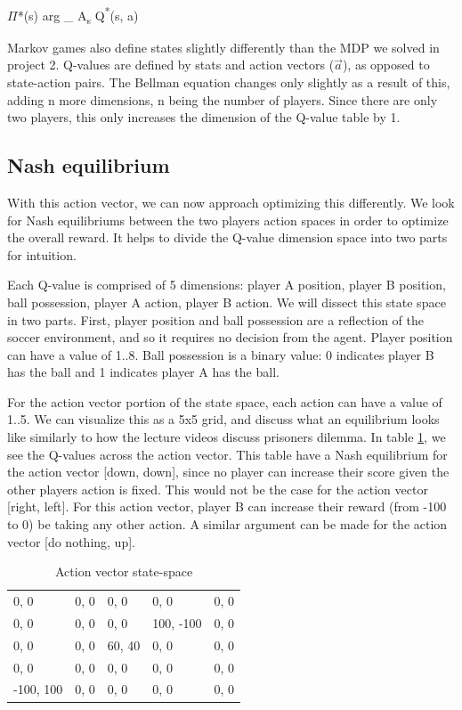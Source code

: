 \documentclass[conference]{IEEEtran}
\begin{document}
\begin{algorithm}
    \label{alg:optimal-policy}
    $\Pi$*(s) \in arg \max_{ \in A\textsubscript{s}} Q\textsuperscript{*}(s, a)
\end{algorithm}

Markov games also define states slightly differently than the MDP we solved in project 2. Q-values are defined by stats and action vectors ($\overrightarrow{a}$), as opposed to state-action pairs. The Bellman equation changes only slightly as a result of this, adding n more dimensions, n being the number of players. Since there are only two players, this only increases the dimension of the Q-value table by 1.

\subsection{Nash equilibrium}
With this action vector, we can now approach optimizing this differently. We look for Nash equilibriums between the two players action spaces in order to optimize the overall reward. It helps to divide the Q-value dimension space into two parts for intuition.

Each Q-value is comprised of 5 dimensions: player A position, player B position, ball possession, player A action, player B action. We will dissect this state space in two parts. First, player position and ball possession are a reflection of the soccer environment, and so it requires no decision from the agent. Player position can have a value of {1..8}. Ball possession is a binary value: 0 indicates player B has the ball and 1 indicates player A has the ball.

For the action vector portion of the state space, each action can have a value of {1..5}. We can visualize this as a 5x5 grid, and discuss what an equilibrium looks like similarly to how the lecture videos discuss prisoners dilemma. In table \ref{table:prisoners-dilemma}, we see the Q-values across the action vector. This table have a Nash equilibrium for the action vector [down, down], since no player can increase their score given the other players action is fixed. This would not be the case for the action vector [right, left]. For this action vector, player B can increase their reward (from -100 to 0) be taking any other action. A similar argument can be made for the action vector [do nothing, up].

\begin{table}[]
    \label{table:prisoners-dilemma}
    \caption{Action vector state-space}
    \hline
    \begin{tabular}{lllll}
    0, 0 & 0, 0 & 0, 0 & 0, 0 & 0, 0 \\
    0, 0 & 0, 0 & 0, 0 & 100, -100 & 0, 0 \\
    0, 0 & 0, 0 & 60, 40 & 0, 0 & 0, 0 \\
    0, 0 & 0, 0 & 0, 0 & 0, 0 & 0, 0 \\
    -100, 100 & 0, 0 & 0, 0 & 0, 0 & 0, 0 \\
    \end{tabular}
    \hline
\end{table}
\end{document}
